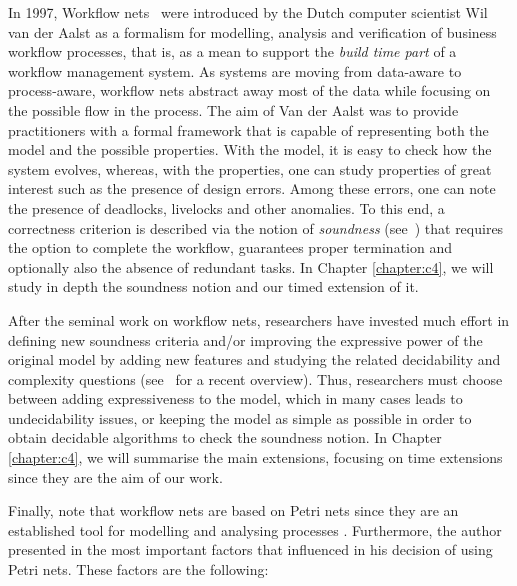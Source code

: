 In 1997, Workflow nets~\cite{Aalst97,Aalst98} were introduced 
by the Dutch computer scientist Wil van der Aalst as a formalism
for modelling, analysis and verification of business workflow processes, that is, as a mean to support
the \emph{build time part} of a workflow management system.
As systems are moving from data-aware to process-aware, workflow nets abstract away most of the data  
while focusing on the possible flow in the process. The aim of Van der Aalst was to provide practitioners with 
a formal framework that is capable of representing both the model and the possible properties. With the model, 
it is easy to check how the system evolves, whereas, with the properties, one can study properties of great interest such as 
the presence of design errors. Among these errors, one can note the presence of deadlocks, livelocks 
and other anomalies. To this end, a correctness criterion is described
via the notion of \emph{soundness} (see~\cite{AalstHHSVVW11}) that
requires the option to complete the workflow, guarantees proper termination
and optionally also the absence of redundant tasks. In Chapter \ref{chapter:c4}, we will study in depth the soundness notion and
our timed extension of it. 

After the seminal work on workflow nets, researchers have 
invested much effort in defining new soundness criteria and/or 
improving the expressive power of the original model by adding new features 
and studying the related decidability and 
complexity questions
(see~\cite{AalstHHSVVW11} for a recent overview). Thus, researchers must choose between 
adding expressiveness to the model, which in many cases leads to undecidability issues, or keeping the model as simple as possible
in order to obtain decidable algorithms to check the soundness notion. In Chapter \ref{chapter:c4}, we will summarise the main extensions, focusing
on time extensions since they are the aim of our work.

Finally, note that workflow nets are based on Petri nets since they are an established tool 
for modelling and analysing processes \cite{Aalst97}. Furthermore, the author presented in \cite{Aalst97} the most important factors
that influenced in his decision of using Petri nets. These factors are the following:

